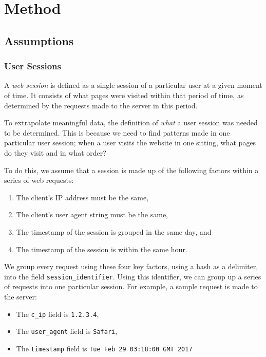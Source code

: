 \section{Method}
\label{sec:method}

\subsection{Assumptions}
\label{sec:method:assumptions}

\subsubsection{User Sessions}
\label{sec:method:assumptions:user_sessions}

A \textit{web session} is defined as a single session of a particular user at a given moment of time. It consists of what pages were visited within that period of time, as determined by the requests made to the server in this period.

To extrapolate meaningful data, the definition of \textit{what} a user session was needed to be determined. This is because we need to find patterns made in one particular user session; when a user visits the website in one sitting, what pages do they visit and in what order?

To do this, we assume that a session is made up of the following factors within a series of web requests:

\begin{enumerate}
  \item The client's IP address must be the same,
  \item The client's user agent string must be the same,
  \item The timestamp of the session is grouped in the same day, and
  \item The timestamp of the session is within the same hour.
\end{enumerate}

We group every request using these four key factors, using a hash as a delimiter, into the field \texttt{session\_identifier}. Using this identifier, we can group up a series of requests into one particular session. For example, a sample request is made to the server:

\begin{itemize}
  \item The \texttt{c\_ip} field is \texttt{1.2.3.4},
  \item The \texttt{user\_agent} field is \texttt{Safari},
  \item The \texttt{timestamp} field is \texttt{Tue Feb 29 03:18:00 GMT 2017}
\end{itemize}

